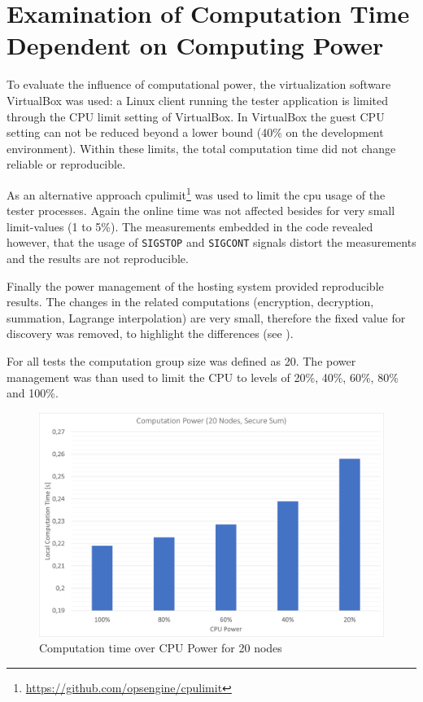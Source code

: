 \section{Examination of Computation Time Dependent on Computing Power} \label{Examination of Computation Time Dependent on Computing Power}
%
To evaluate the influence of computational power, the virtualization software VirtualBox was used: a Linux client running the tester application is limited through the CPU limit setting of VirtualBox. In VirtualBox the guest CPU setting can not be reduced beyond a lower bound (40\% on the development environment). Within these limits, the total computation time did not change reliable or reproducible.

As an alternative approach cpulimit\footnote{\url{https://github.com/opsengine/cpulimit}} was used to limit the cpu usage of the tester processes. Again the online time was not affected besides for very small limit-values (1 to 5\%). The measurements embedded in the code revealed however, that the usage of \lstinline|SIGSTOP| and \lstinline|SIGCONT| signals distort the measurements and the results are not reproducible.

Finally the power management of the hosting system provided reproducible results. The changes in the related computations (encryption, decryption, summation, Lagrange interpolation) are very small, therefore the fixed value for discovery was removed, to highlight the differences (see ).

For all tests the computation group size was defined as 20. The power management was than used to limit the CPU to levels of 20\%, 40\%, 60\%, 80\% and 100\%.
\begin{figure}[!htbp] %
	\caption{Computation time over CPU Power for 20 nodes} \label{figure:Computation time over CPU Power for 20 nodes}
	\includegraphics[scale=1.0]{figures/eval_power.png}
\end{figure}

